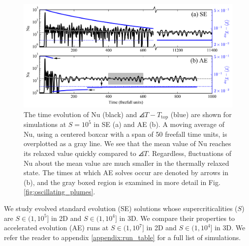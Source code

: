 \begin{figure}[bt!]
\includegraphics[width=\textwidth]{./figs/nu_v_time.png}
\caption{The time evolution of Nu (black) and $\angles{T} - T_{\text{top}}$ (blue)
are shown for simulations at $S = 10^5$ in SE (a) and AE (b).
A moving average of Nu, using a centered boxcar with a span of 50 freefall time
units, is overplotted as a gray line. 
We see that the mean value of Nu reaches its relaxed value quickly
compared to $\angles{T}$.
Regardless, fluctuations of Nu about the mean
value are much smaller in the thermally relaxed state.
The times at which AE solves occur are denoted by arrows in (b),
and the gray boxed region is examined in more detail in Fig. \ref{fig:oscillating_plumes}.
\label{fig:nu_v_time} }
\end{figure}


We study evolved standard evolution (SE) solutions whose supercriticalities ($S$) are 
$S \in (1, 10^5]$ in 2D and $S \in (1, 10^4]$ in
3D. We compare their properties to
accelerated evolution (AE) runs at $S \in (1, 10^7]$ in 2D and
$S \in (1, 10^4]$ in 3D.
We refer the reader to appendix \ref{appendix:run_table} for a full list of
simulations.


